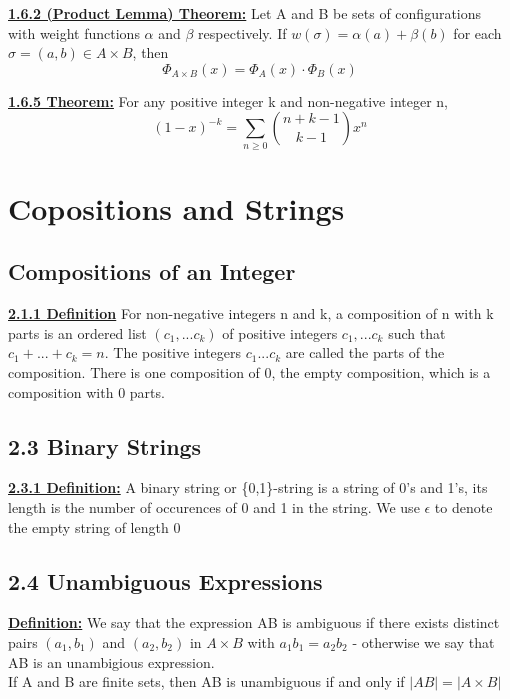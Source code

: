 \documentclass[12pt]{article}
\newcommand{\myt}[1]{\textbf{\underline{#1}}}
\begin{document}
	\myt{1.6.2 (Product Lemma) Theorem:} Let A and B be sets of configurations with weight functions $\alpha$ and $\beta$ respectively. If $w(\sigma) = \alpha(a) + \beta(b)$ for each $\sigma = (a,b) \in A \times B$, then\\
	$$\Phi_{A \times B}(x) = \Phi_A(x) \cdot \Phi_B(x)$$
	
	\myt{1.6.5 Theorem:} For any positive integer k and non-negative integer n,\\
	$$(1-x)^{-k} = \sum_{n \geq 0}{n+k-1 \choose k-1}x^n$$
	
	\section{Copositions and Strings}
	\subsection{Compositions of an Integer}
	\myt{2.1.1 Definition} For non-negative integers n and k, a composition of n with k parts is an ordered list $(c_1, ...c_k)$ of positive integers $c_1, ...c_k$ such that $c_1 + ... + c_k = n$. The positive integers $c_1...c_k$ are called the parts of the composition. There is one composition of 0, the empty composition, which is a composition with 0 parts.\\
	
	\subsection*{2.3 Binary Strings}
	\myt{2.3.1 Definition:} A binary string or \{0,1\}-string is a string of 0's and 1's, its length is the number of occurences of 0 and 1 in the string. We use $\epsilon$ to denote the empty string of length 0\\
	
	\subsection*{2.4 Unambiguous Expressions}
	\myt{Definition:} We say that the expression AB is ambiguous if there exists distinct pairs $(a_1, b_1)$ and $(a_2, b_2)$ in $A \times B$ with $a_1b_1 = a_2b_2$ - otherwise we say that AB is an unambigious expression.\\
	
	If A and B are finite sets, then AB is unambiguous if and only if $|AB| = |A\times B|$\\
	
\end{document}
